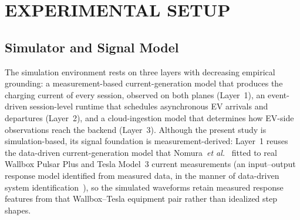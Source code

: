 \documentclass{ieeeaccess}
\newif\ifhighlight \highlightfalse
\DeclareRobustCommand{\revised}[1]{\ifhighlight{\color{blue}#1}\else{\color{.}#1}\fi}
\begin{document}
    \section{EXPERIMENTAL SETUP}

    \subsection{Simulator and Signal Model}

    The simulation environment rests on three layers with decreasing empirical grounding: a measurement-based current-generation model that produces the \revised{charging current of every session, observed on both planes} (Layer~1), an event-driven session-level runtime that schedules asynchronous EV arrivals and departures (Layer~2), and a cloud-ingestion model that determines how EV-side observations reach the backend (Layer~3).
    Although the present study is simulation-based, its signal foundation is measurement-derived: Layer~1 reuses the data-driven current-generation model that Nomura~\textit{et al.}~\cite{b14} fitted to real Wallbox Pulsar Plus and Tesla Model~3 current measurements \revised{(an input--output response model identified from measured data, in the manner of data-driven system identification~\cite{bbakirci23})}, so the simulated waveforms retain measured response features from that Wallbox--Tesla equipment pair rather than idealized step shapes.
\end{document}
